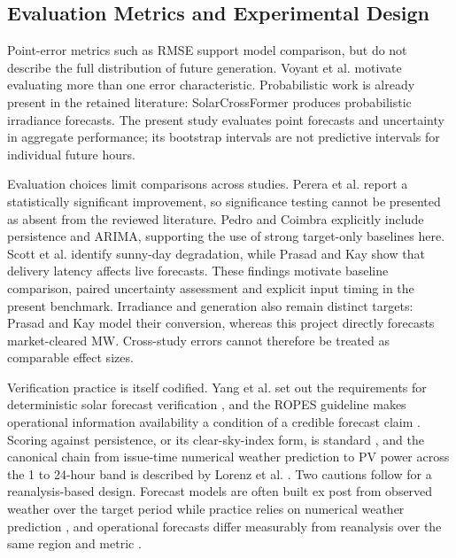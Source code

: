 \subsection{Evaluation Metrics and Experimental Design}

Point-error metrics such as RMSE support model comparison, but do not describe the full distribution of future generation. Voyant et al. \cite{voyant2025nice} motivate evaluating more than one error characteristic. Probabilistic work is already present in the retained literature: SolarCrossFormer \cite{schubnel2025solarcross} produces probabilistic irradiance forecasts. The present study evaluates point forecasts and uncertainty in aggregate performance; its bootstrap intervals are not predictive intervals for individual future hours.

Evaluation choices limit comparisons across studies. Perera et al. \cite{perera2024dayahead} report a statistically significant improvement, so significance testing cannot be presented as absent from the reviewed literature. Pedro and Coimbra \cite{pedro2012assessment} explicitly include persistence and ARIMA, supporting the use of strong target-only baselines here. Scott et al. \cite{scott2025transformers} identify sunny-day degradation, while Prasad and Kay \cite{prasad2021prediction} show that delivery latency affects live forecasts. These findings motivate baseline comparison, paired uncertainty assessment and explicit input timing in the present benchmark. Irradiance and generation also remain distinct targets: Prasad and Kay \cite{prasad2021prediction} model their conversion, whereas this project directly forecasts market-cleared MW. Cross-study errors cannot therefore be treated as comparable effect sizes.

Verification practice is itself codified. Yang et al. set out the requirements for deterministic solar forecast verification \cite{yang2020verification}, and the ROPES guideline makes operational information availability a condition of a credible forecast claim \cite{yang2019guideline}. Scoring against persistence, or its clear-sky-index form, is standard \cite{farah2021time}, and the canonical chain from issue-time numerical weather prediction to PV power across the 1 to 24-hour band is described by Lorenz et al. \cite{lorenz2009irradiance}. Two cautions follow for a reanalysis-based design. Forecast models are often built ex post from observed weather over the target period while practice relies on numerical weather prediction \cite{yang2022historical}, and operational forecasts differ measurably from reanalysis over the same region and metric \cite{huang2018assessing}.

